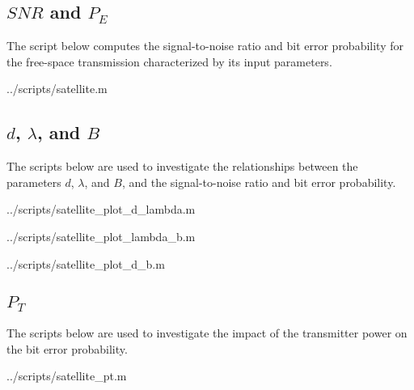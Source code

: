 \subsection{$SNR$ and $P_E$}
The script below computes the signal-to-noise ratio and bit error probability for the free-space transmission characterized by its input parameters.

\begin{lstinputlisting}[language=Octave]{../scripts/satellite.m}
\end{lstinputlisting}


\subsection{$d$, $\lambda$, and $B$}
The scripts below are used to investigate the relationships between the parameters $d$, $\lambda$, and $B$, and the signal-to-noise ratio and bit error probability.

\begin{lstinputlisting}[language=Octave]{../scripts/satellite_plot_d_lambda.m}
\end{lstinputlisting}

\begin{lstinputlisting}[language=Octave]{../scripts/satellite_plot_lambda_b.m}
\end{lstinputlisting}

\begin{lstinputlisting}[language=Octave]{../scripts/satellite_plot_d_b.m}
\end{lstinputlisting}


\subsection{$P_T$}
The scripts below are used to investigate the impact of the transmitter power on the bit error probability.

\begin{lstinputlisting}[language=Octave]{../scripts/satellite_pt.m}
\end{lstinputlisting}
